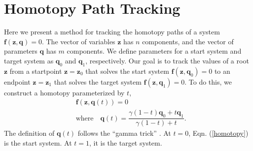 \documentclass[journal]{IEEEtran}
\begin{document}
\section{Homotopy Path Tracking}
\label{app:tracking}

Here we present a method for tracking the homotopy paths of a system $\mathbf{f}(\mathbf{z},\mathbf{q})=0$.  The vector of variables $\mathbf{z}$ has $n$ components, and the vector of parameters $\mathbf{q}$ has $m$ components.
We define parameters for a start system and target system as $\mathbf{q}_0$ and $\mathbf{q}_1$, respectively.
Our goal is to track the values of a root $\mathbf{z}$ from a startpoint $\mathbf{z}=\mathbf{z}_0$ that solves the start system $\mathbf{f}(\mathbf{z},\mathbf{q}_0) = 0$ to an endpoint $\mathbf{z}=\mathbf{z}_1$ that solves the target system $\mathbf{f}(\mathbf{z},\mathbf{q}_1) = 0$.
To do this, we construct a homotopy parameterized by $t$,
\begin{align}
&\mathbf{f}(\mathbf{z},\mathbf{q}(t)) = 0 \label{homotopy}\\
&\text{where} \quad \mathbf{q}(t) = \dfrac{\gamma(1-t)\mathbf{q}_0 + t\mathbf{q}_1}{\gamma(1-t) + t}.
\end{align}
The definition of $\mathbf{q}(t)$ follows the ``gamma trick'' \cite{batesNumericallySolvingPolynomial2013}.  At $t=0$, Eqn. (\ref{homotopy}) is the start system.  At $t=1$, it is the target system.
\end{document}
